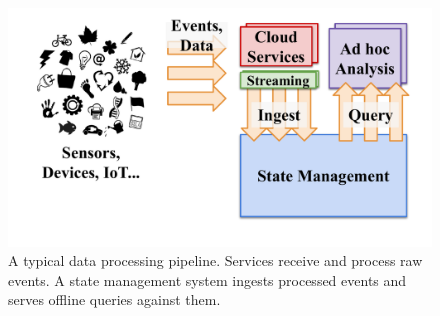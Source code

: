 \begin{figure}[t]
\centering
\includegraphics[width=0.93\columnwidth]{figures/pipeline.pdf}
\vspace{-2ex}
\caption{
A typical data processing pipeline. Services receive and
process raw events. A state management system ingests processed
events and serves offline queries against them.}
\label{fig:pipeline}
\end{figure}
